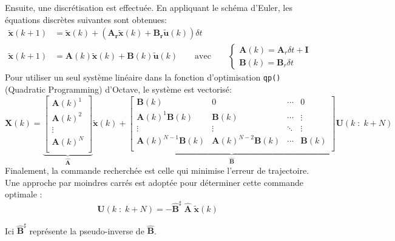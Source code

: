 \documentclass[../CSC_5RO16_TA_TP4.tex]{subfiles}
\begin{document}
\noindent Ensuite, une discrétisation est effectuée. En appliquant le schéma d'Euler, les équations discrètes suivantes sont obtenues:
\begin{equation}
    \begin{aligned}
        \mathbf{\widetilde{x}}(k+1) &= \mathbf{\widetilde{x}}(k) + (\mathbf{A}_{\mathbf{r}}\mathbf{\widetilde{x}}(k) + \mathbf{B}_{\mathbf{r}}\widetilde{\mathbf{u}}(k))\delta t\\
        \mathbf{\widetilde{x}}(k+1) &= \mathbf{A}(k)\mathbf{\widetilde{x}}(k) + \mathbf{B}(k)\mathbf{\widetilde{u}}(k)
        \qquad\text{avec}\qquad
        \begin{cases}
            \mathbf{A}(k) = \mathbf{A}_{r}\delta t + \mathbf{I}\\
            \mathbf{B}(k) = \mathbf{B}_{r}\delta t
        \end{cases}
    \end{aligned}
\end{equation}
\noindent Pour utiliser un seul système linéaire dans la fonction d'optimisation \texttt{qp()} (Quadratic Programming) d'Octave, le système est vectorisé:
\begin{equation}
    \mathbf{X}(k) = \underbrace{
        \begin{bmatrix}
            \mathbf{A}(k)^{1}\\
            \mathbf{A}(k)^{2}\\
            \vdots\\
            \mathbf{A}(k)^{N}\\
        \end{bmatrix}
    }_{\hat{\mathbf{A}}} \widetilde{\mathbf{x}}(k) + 
    \underbrace{
        \begin{bmatrix}
            \mathbf{B}(k) & 0 & \cdots & 0\\
            \mathbf{A}(k)^{1}\mathbf{B}(k) & \mathbf{B}(k) & \cdots & \vdots\\
            \vdots & \vdots & \ddots & \vdots\\
            \mathbf{A}(k)^{N-1}\mathbf{B}(k) & \mathbf{A}(k)^{N-2}\mathbf{B}(k) & \cdots & \mathbf{B}(k)\\
        \end{bmatrix}
    }_{\hat{\mathbf{B}}} \mathbf{U}(k\;:\;k+N)
\end{equation}
\noindent Finalement, la commande recherchée est celle qui minimise l’erreur de trajectoire. Une approche par moindres carrés est adoptée pour déterminer cette commande optimale :
\begin{equation}
    \mathbf{U}(k\;:\;k+N) = -\hat{\mathbf{B}}^{\sharp}\;\hat{\mathbf{A}}\;\widetilde{\mathbf{x}}(k)
\end{equation}
\begin{remark}
    Ici $\hat{\mathbf{B}}^{\sharp}$ représente la pseudo-inverse de $\hat{\mathbf{B}}$.
\end{remark}
\end{document}
